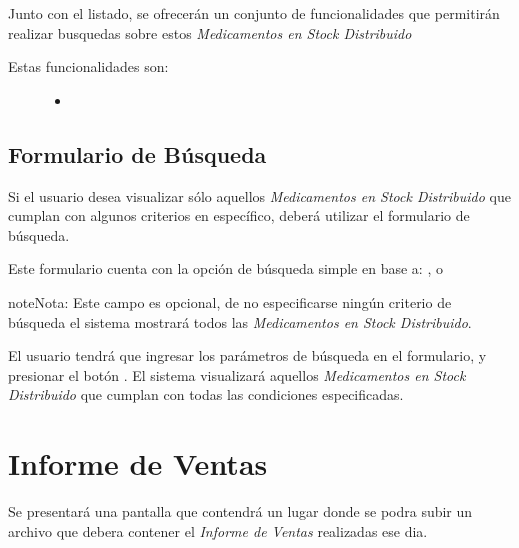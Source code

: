 \documentclass[a4paper,10pt,spanish]{sphinxmanual}
\begin{document}

Junto con el listado, se ofrecerán un conjunto de funcionalidades que permitirán realizar busquedas sobre estos \emph{Medicamentos en Stock Distribuido}
\begin{description}
\item[{Estas funcionalidades son:}] \leavevmode\begin{itemize}
\item {} 
{\hyperref[stockdistribuido:formulario\string-busqueda\string-stock]{}}

\end{itemize}

\end{description}


\section{Formulario de Búsqueda}
\label{stockdistribuido:formulario-de-busqueda}\label{stockdistribuido:formulario-busqueda-stock}
Si el usuario desea visualizar sólo aquellos \emph{Medicamentos en Stock Distribuido} que cumplan con algunos criterios en específico, deberá utilizar el formulario de búsqueda.


Este formulario cuenta con la opción de búsqueda simple en base a: ,  o 

\begin{notice}{note}{Nota:}
Este campo es opcional, de no especificarse ningún criterio de búsqueda el sistema mostrará todos las \emph{Medicamentos en Stock Distribuido}.
\end{notice}

El usuario tendrá que ingresar los parámetros de búsqueda en el formulario, y presionar el botón . El sistema visualizará aquellos \emph{Medicamentos en Stock Distribuido} que cumplan con todas las condiciones especificadas.


\chapter{Informe de Ventas}
\label{informedeventas::doc}\label{informedeventas:informe-de-ventas}
Se presentará una pantalla que contendrá un lugar donde se podra subir un archivo que debera contener el \emph{Informe de Ventas} realizadas ese dia.
\end{document}
